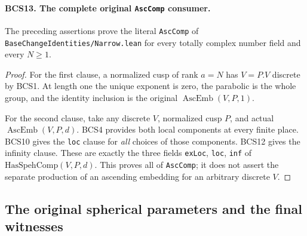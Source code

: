 \paragraph{BCS13. The complete original \texttt{AscComp} consumer.}
\label{claim:BCS13}
The preceding assertions prove the literal \texttt{AscComp} of
\texttt{BaseChangeIdentities/Narrow.lean} for every totally complex
number field and every \(N\ge1\).
\begin{proof}
For the first clause, a normalized cusp of rank \(a=N\) has
\(V=P.V\) discrete by BCS1.  At length one the unique exponent
is zero, the parabolic is the whole group, and the identity inclusion
is the original \(\operatorname{AscEmb}(V,P,1)\).

For the second clause, take any discrete \(V\), normalized cusp
\(P\), and actual \(\operatorname{AscEmb}(V,P,d)\).
BCS4 provides both local components at every finite place.
BCS10 gives the \texttt{loc} clause for \emph{all} choices of
those components.  BCS12 gives the infinity clause.  These are
exactly the three fields \texttt{exLoc}, \texttt{loc}, \texttt{inf}
of \(\mathrm{HasSpehComp}(V,P,d)\).  This proves all of
\texttt{AscComp}; it does not assert the separate production of an
ascending embedding for an arbitrary discrete \(V\).
\end{proof}

\subsection{The original spherical parameters and the final witnesses}

